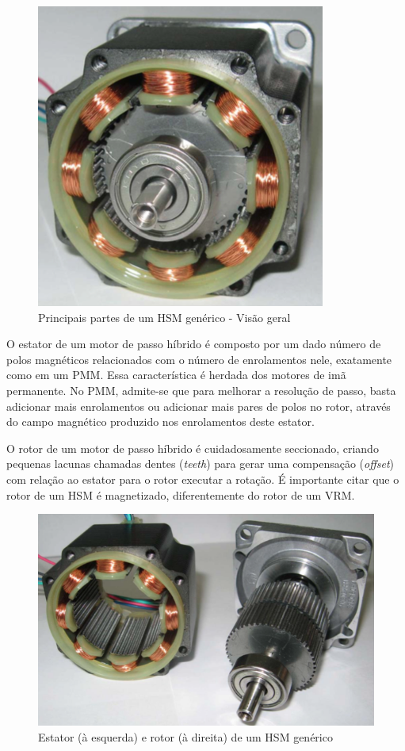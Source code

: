 \documentclass[portugues]{sobraep}
\begin{document}
	\begin{figure}[!h]
		\centering
		\includegraphics[scale=.45]{Images/hsmreal1}
		\caption{Principais partes de um HSM genérico - Visão geral \cite{ieeeRusso}}
		\label{HSMreal}
	\end{figure} 
	
	O estator de um motor de passo híbrido é composto por um dado número de polos magnéticos relacionados com o número de enrolamentos nele, exatamente como em um PMM. Essa característica é herdada dos motores de imã permanente. No PMM, admite-se que para melhorar a resolução de passo, basta adicionar mais enrolamentos ou adicionar mais pares de polos no rotor, através do campo magnético produzido nos enrolamentos deste estator. 
	
	O rotor de um motor de passo híbrido é cuidadosamente seccionado, criando pequenas lacunas chamadas dentes (\textit{teeth}) para gerar uma compensação (\textit{offset}) com relação ao estator para o rotor executar a rotação. É importante citar que o rotor de um HSM é magnetizado, diferentemente do rotor de um VRM.
	
	\begin{figure}[!h]
		\centering
		\includegraphics[scale=.4]{Images/hsmreal2}
		\caption{Estator (à esquerda) e rotor (à direita) de um HSM genérico \cite{ieeeRusso}}
		\label{HSMestatorrotor}
	\end{figure} 
	
\end{document}
